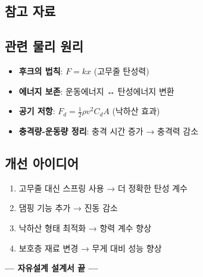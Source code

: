 \documentclass[a4paper,12pt]{article}
\begin{document}
\begin{CJK}{UTF8}{mj}
\section{참고 자료}

\subsection{관련 물리 원리}

\begin{itemize}
    \item \textbf{후크의 법칙}: $F = kx$ (고무줄 탄성력)
    \item \textbf{에너지 보존}: 운동에너지 ↔ 탄성에너지 변환
    \item \textbf{공기 저항}: $F_d = \frac{1}{2}\rho v^2 C_d A$ (낙하산 효과)
    \item \textbf{충격량-운동량 정리}: 충격 시간 증가 → 충격력 감소
\end{itemize}

\subsection{개선 아이디어}

\begin{enumerate}
    \item 고무줄 대신 스프링 사용 → 더 정확한 탄성 계수
    \item 댐핑 기능 추가 → 진동 감소
    \item 낙하산 형태 최적화 → 항력 계수 향상
    \item 보호층 재료 변경 → 무게 대비 성능 향상
\end{enumerate}

\vspace{1cm}

\begin{center}
\large
\textbf{--- 자유설계 설계서 끝 ---}
\end{center}

\end{CJK}
\end{document}
